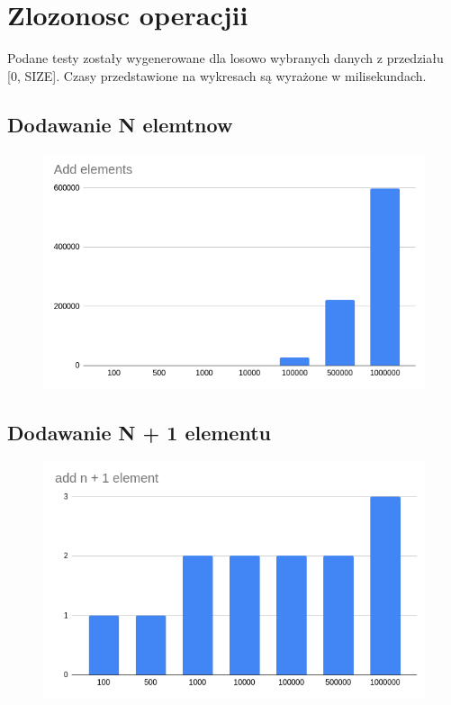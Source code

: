 \documentclass{article}
\begin{document}
\section*{Zlozonosc operacjii}

Podane testy zostały wygenerowane dla losowo wybranych danych z przedziału [0, SIZE]. Czasy przedstawione na wykresach są wyrażone w milisekundach.

\subsection*{Dodawanie N elemtnow}
\begin{figure}[H]
    \centering
    \includegraphics[width=\textwidth]{"../assets/4_1.png"}
    \label{fig:4_1}
\end{figure}

\subsection*{Dodawanie N + 1 elementu}

\begin{figure}[H]
    \centering
    \includegraphics[width=\textwidth]{"../assets/4_2.png"}
    \label{fig:4_2}
\end{figure}
\end{document}
